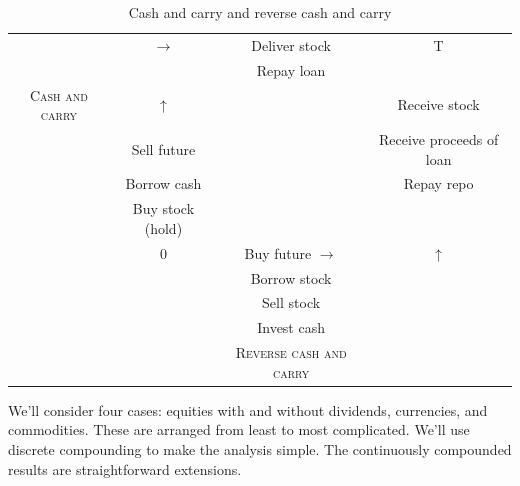 

\begin{tiny}
\begin{table}
\begin{tabular}{cc|c|c}
&$\rightarrow$ & Deliver stock & T\\ 
 & & Repay loan & \\
\hline
\textsc{Cash and carry}&$\uparrow$ & & Receive stock\\
& Sell future    & &   Receive proceeds of loan \\
& Borrow cash & & Repay repo \\
& Buy stock (hold)  & & \\
\hline
& 0  & Buy future  $\rightarrow$ & $\uparrow$ \\
& &  Borrow stock & \\
&& Sell stock  & \\
&  & Invest cash & \\
& & \textsc{Reverse cash and carry} & \\
\end{tabular}\label{ccrcc}
\caption{Cash and carry and reverse cash and carry}
\end{table}
\end{tiny}


We'll consider four cases: equities with and without dividends, currencies, and commodities. These are arranged from least to most complicated. We'll use discrete compounding to make the analysis simple. The continuously compounded results are straightforward extensions.

